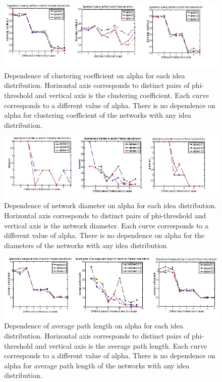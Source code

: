 \documentclass{beamer}
\begin{document}
\begin{frame}
\begin{figure}
[htp]
\begin{center}
\includegraphics{Fig11}
\end{center}
\caption{ Dependence of clustering coefficient on alpha for each idea distribution. Horizontal axis corresponds to distinct pairs of phi-threshold and   vertical axis is the clustering coefficient. Each curve corresponds to a different value of alpha. There is no dependence on alpha for clustering coefficient of the networks with any idea distribution.}
\label {fig11}
\end{figure}\begin{figure}
[htp]
\begin{center}
\includegraphics{Fig12}
\end{center}
\caption{ Dependence of network diameter on alpha for each idea distribution. Horizontal axis corresponds to distinct pairs of phi-threshold and vertical axis is the network diameter. Each curve corresponds to a different value of alpha. There is no dependence on alpha for the diameters of the networks with any idea distribution}
\label {fig12}
\end{figure}\begin{figure}
[htp]
\begin{center}
\includegraphics{Fig13}
\end{center}
\caption{Dependence of average path length on alpha for each idea distribution. Horizontal axis corresponds to distinct pairs of phi-threshold and   vertical axis is the average path length. Each curve corresponds to a different value of alpha. There is no dependence on alpha for average path length of the networks with any idea distribution.}
\label {fig13}
\end{figure}

\end{frame}
\end{document}
